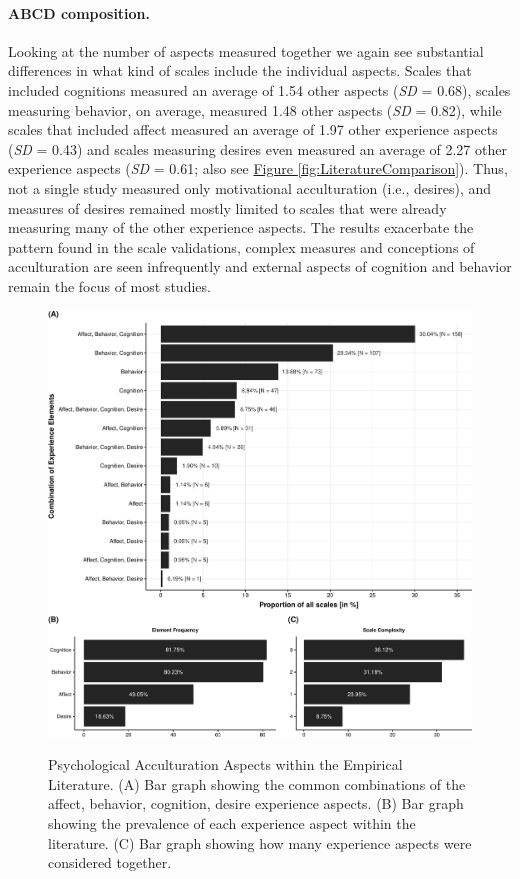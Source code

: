 \documentclass[man, 12pt, a4paper, mask]{apa7}
\newcommand{\fgrref}[2][]{\hyperref[#2]{Figure \ref*{#2}#1}}
\begin{document}
\paragraph{ABCD composition.}

Looking at the number of aspects measured together we again see
substantial differences in what kind of scales include the individual
aspects. Scales that included cognitions measured an average of 1.54
other aspects (\textit{SD} = 0.68), scales measuring behavior, on
average, measured 1.48 other aspects (\textit{SD} = 0.82), while scales
that included affect measured an average of 1.97 other experience
aspects (\textit{SD} = 0.43) and scales measuring desires even measured
an average of 2.27 other experience aspects (\textit{SD} = 0.61; also
see \fgrref{fig:LiteratureComparison}). Thus, not a single study
measured only motivational acculturation (i.e., desires), and measures
of desires remained mostly limited to scales that were already measuring
many of the other experience aspects. The results exacerbate the pattern
found in the scale validations, complex measures and conceptions of
acculturation are seen infrequently and external aspects of cognition
and behavior remain the focus of most studies.

\begin{figure}[h]
\centering
\caption{Psychological Acculturation Aspects within the Empirical Literature. (A) Bar graph showing the common combinations of the affect, behavior, cognition, desire experience aspects. (B) Bar graph showing the prevalence of each experience aspect within the literature. (C) Bar graph showing how many experience aspects were considered together.}
\includegraphics[width=\textwidth]{Figures/EmpPlotFreq-1}
\label{fig:EmpPlotFreq-1}
\end{figure}
\end{document}
